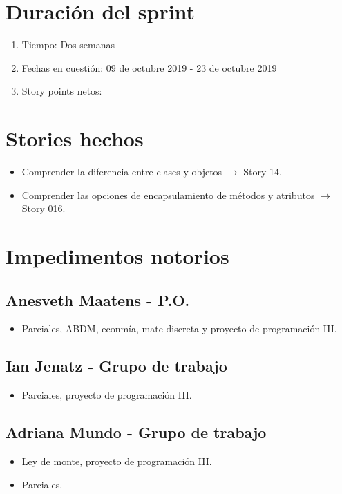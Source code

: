 \section{Duración del sprint}
\begin{enumerate}
    \item Tiempo: Dos semanas
    \item Fechas en cuestión: 09 de octubre 2019 - 23 de octubre 2019
    \item Story points netos: 
\end{enumerate}
\section{Stories hechos}
\begin{itemize}
    \item Comprender la diferencia entre clases y objetos $\rightarrow$ Story 14.
    \item Comprender las opciones de encapsulamiento de métodos y atributos $\rightarrow$ Story 016.
\end{itemize}

\section{Impedimentos notorios}
\subsection{Anesveth Maatens - P.O.}
\begin{itemize}
    \item Parciales, ABDM, econmía, mate discreta y  proyecto de programación III.
\end{itemize}
\subsection{Ian Jenatz - Grupo de trabajo}
\begin{itemize}
    \item Parciales, proyecto de programación III.
\end{itemize}
\subsection{Adriana Mundo - Grupo de trabajo}
\begin{itemize}
    \item Ley de monte, proyecto de programación III.
    \item Parciales.
\end{itemize}


